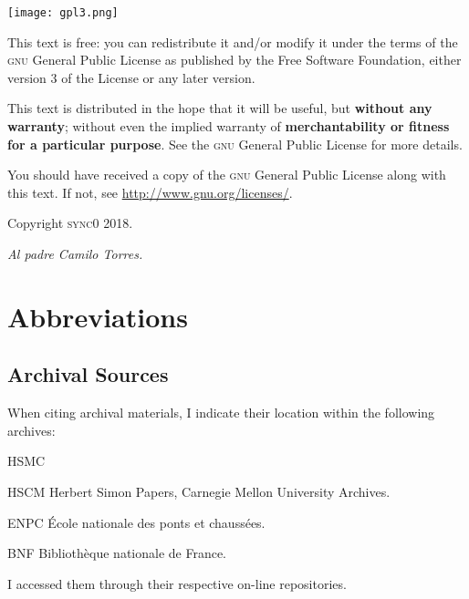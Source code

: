 \documentclass[version=last,draft=true,paper=A4,portrait,twoside=true,twocolumn=false,headinclude=false,footinclude=false,fontsize=12,BCOR=20mm,DIV=calc,pagesize=auto,titlepage=firstiscover,mpinclude=true,open=right,chapterprefix=true,numbers=autoendperiod,headsepline=false,parskip=false]{scrbook}
\begin{document}
\newpage
\vspace*{\fill}
\noindent
\texttt{[image: gpl3.png]}\par
\vspace{1\baselineskip}
This text is free: you can redistribute it and/or modify it
under the terms of the \textsc{gnu} General Public License as published by
the Free Software Foundation, either version 3 of the License or any later
version.

This text is distributed in the hope that it will be useful, but \textbf{without
any warranty}; without even the implied warranty of \textbf{merchantability or 
fitness for a particular purpose}. See the \textsc{gnu} General 
Public License for more details.

You should have received a copy of the \textsc{gnu} General Public License along
with this text. If not, see \url{http://www.gnu.org/licenses/}.

\vspace{1\baselineskip}
\noindent
Copyright \textcopyright \textsc{sync0} 2018. 

\newpage\null\newpage

\begin{FlushRight}
\begin{spanish}
\textit{Al padre Camilo Torres.}
\end{spanish}
\end{FlushRight}

\newpage
\tableofcontents 
\frontmatter
\pagestyle{plain}
\chapter*{Abbreviations} 
\section*{Archival Sources}

When citing archival materials, I indicate their location within the
following archives:

\begin{labeling}[:]{HSMC} 
\item[HSCM] Herbert Simon Papers, Carnegie Mellon University Archives.
\item[ENPC] École nationale des ponts et chaussées.
\item[BNF] Bibliothèque nationale de France. 
\end{labeling}

I accessed them through their respective on-line repositories.
\end{document}
